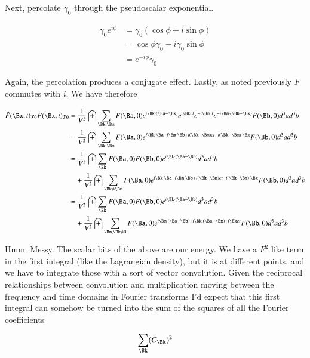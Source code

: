 \documentclass{article}
\begin{document}
Next, percolate $\gamma_0$ through the pseudoscalar exponential.

\begin{align*}
\gamma_0 e^{i\phi} 
&= \gamma_0 (\cos\phi + i \sin\phi) \\
&= \cos\phi \gamma_0 - i \gamma_0 \sin\phi \\
&= e^{-i\phi} \gamma_0
\end{align*}

Again, the percolation produces a conjugate effect.  Lastly, as noted previously $F$ commutes with $i$.  We have therefore

\begin{align*}
\tilde{F}(\Bx,t) \gamma_0 {F}(\Bx,t) \gamma_0
&=
\frac{1}{V^2} \int \sum_{\Bk,\Bm} 
F(\Ba, 0) 
e^{i \Bk \cdot (\Ba -\Bx) }
e^{ i \Bk ct }
e^{ -i \Bm ct } e^{ -i \Bm \cdot (\Bb -\Bx) } F(\Bb, 0) d^3 a d^3 b \\
&= \frac{1}{V^2} \int \sum_{\Bk,\Bm} F(\Ba, 0) e^{ i \Bk \cdot \Ba -i \Bm \cdot \Bb + i (\Bk -\Bm) ct -i (\Bk - \Bm) \cdot \Bx } F(\Bb, 0) d^3 a d^3 b \\
&= \frac{1}{V^2} \int \sum_{\Bk} F(\Ba, 0) F(\Bb, 0) e^{ i \Bk \cdot (\Ba - \Bb) } d^3 a d^3 b \\
&\quad + \frac{1}{V^2} \int \sum_{\Bk \ne \Bm} F(\Ba, 0) e^{ i \Bk \cdot \Ba -i \Bm \cdot \Bb + i (\Bk -\Bm) ct -i (\Bk - \Bm) \cdot \Bx } F(\Bb, 0) d^3 a d^3 b \\
&= \frac{1}{V^2} \int \sum_{\Bk} F(\Ba, 0) F(\Bb, 0) e^{ i \Bk \cdot (\Ba - \Bb) } d^3 a d^3 b \\
&\quad + \frac{1}{V^2} \int \sum_{\Bm, \Bk \ne 0} F(\Ba, 0) e^{ 
i \Bm \cdot (\Ba -\Bb) 
+i \Bk \cdot (\Ba -\Bx)
+ i \Bk ct 
} F(\Bb, 0) d^3 a d^3 b \\
\end{align*}

Hmm.  Messy.  The scalar bits of the above are our energy.  We have a $F^2$ like term in the first integral (like the Lagrangian density), but it is at different points, and
we have to integrate those with a sort of vector convolution.  Given the reciprocal relationships between convolution and multiplication moving between the frequency and time domains in Fourier transforms I'd expect that this first integral can somehow be turned into the sum of the squares of all the Fourier coefficients

\begin{align*}
\sum_{\Bk} ({C}_{\Bk})^2 
\end{align*}
\end{document}
